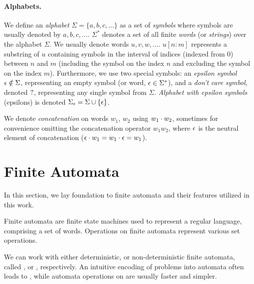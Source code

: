 \paragraph{Alphabets.}
We define an \emph{alphabet} $\Sigma = \{ a, b, c, \ldots \}$ as a set of \emph{symbols} where
symbols are usually denoted by $a, b, c, \ldots$.
$\Sigma^*$ denotes a set of all finite \emph{words} (or \emph{strings}) over the alphabet $\Sigma$.
We usually denote words $u, v, w, \ldots$.
$u[n:m]$ represents a substring of $u$ containing symbols in the interval of indices (indexed from 0) between $n$ and $m$ (including the symbol on the index $n$ and excluding the symbol on the index $m$).
Furthermore, we use two special symbols: an \emph{epsilon symbol} $\epsilon \notin \Sigma$, representing an empty symbol (or word, $\epsilon \in \Sigma^*$), and a \emph{don't care symbol}, denoted $?$, representing any single symbol from $\Sigma$.
\emph{Alphabet with epsilon symbols} (epsilons) is denoted $\Sigma_\epsilon = \Sigma \cup \{ \epsilon \}$.

We denote \emph{concatenation} on words $w_1$, $w_2$ using $w_1 \cdot w_2$, sometimes for convenience omitting the concatenation operator $w_1w_2$, where $\epsilon$ is the neutral element of concatenation ($\epsilon \cdot w_1 = w_1 \cdot \epsilon = w_1$).

\section{Finite Automata}

In this section, we lay foundation to finite automata and their features utilized in this work.

Finite automata are finite state machines used to represent a regular language, comprising a set of words.
Operations on finite automata represent various set operations.

We can work with either deterministic, or non-deterministic finite automata, called \dfa, or \nfa, respectively.
An intuitive encoding of problems into automata often leads to \nfas, while automata operations on \dfas are usually faster and simpler.

